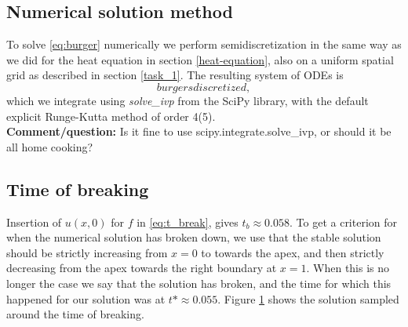 \subsection*{Numerical solution method}
To solve \eqref{eq:burger} numerically we perform semidiscretization in the same way as we did for the heat equation in section \ref{heat-equation}, 
also on a uniform spatial grid as described in section \ref{task_1}. 
The resulting system of ODEs is
\begin{equation*}
    burgers discretized, 
\end{equation*}
which we integrate using \textit{solve\_ivp} from the SciPy library, 
with the default explicit Runge-Kutta method of order 4(5)\cite{solve_ivp}. \\
\textbf{Comment/question:} Is it fine to use scipy.integrate.solve\_ivp, 
or should it be all home cooking? 

\subsection{Time of breaking}
Insertion of $u(x, 0)$ for $f$ in \eqref{eq:t_break}, 
gives $t_b \approx 0.058$. 
To get a criterion for when the numerical solution has broken down, 
we use that the stable solution should be strictly increasing from $x=0$ to towards the apex, 
and then strictly decreasing from the apex towards the right boundary at $x=1$. 
When this is no longer the case we say that the solution has broken, 
and the time for which this happened for our solution was at $t* \approx 0.055$. 
Figure \ref{fig:burgers-samples} shows the solution sampled around the time of breaking. 

\begin{figure}[ht]
    \centering
    
    \label{fig:burgers-samples}
\end{figure}
